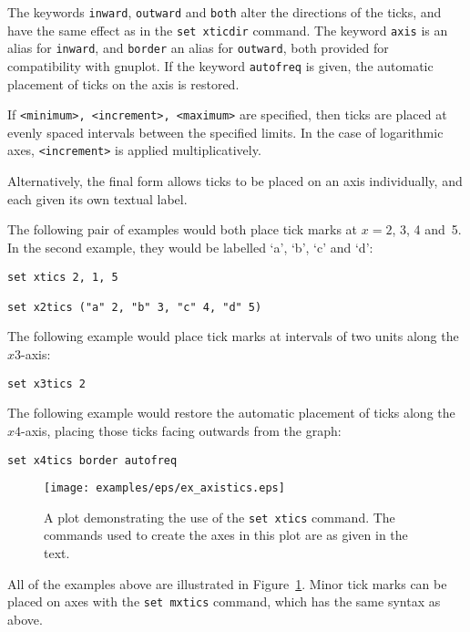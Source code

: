 The keywords {\tt inward}, {\tt outward} and {\tt both} alter the
directions of the ticks, and have the same effect as in the {\tt set
xticdir} command. The keyword {\tt axis} is an alias for {\tt inward},
and {\tt border} an alias for {\tt outward}, both provided for
compatibility with gnuplot. If the keyword {\tt autofreq} is given, the automatic
placement of ticks on the axis is restored.

If {\tt <minimum>, <increment>, <maximum>} are specified, then ticks are
placed at evenly spaced intervals between the specified limits. In the case of
logarithmic axes, {\tt <increment>} is applied multiplicatively.

Alternatively, the final form allows ticks to be placed on an axis
individually, and each given its own textual label.

The following pair of examples would both place tick marks at $x=2$, 3, 4 and~5.
In the second example, they would be labelled `a', `b', `c' and `d':

\begin{verbatim}
set xtics 2, 1, 5

set x2tics ("a" 2, "b" 3, "c" 4, "d" 5)
\end{verbatim}

The following example would place tick marks at intervals of two units along
the $x3$-axis:

\begin{verbatim}
set x3tics 2
\end{verbatim}

The following example would restore the automatic placement of ticks along the
$x4$-axis, placing those ticks facing outwards from the graph:

\begin{verbatim}
set x4tics border autofreq
\end{verbatim}

\begin{figure}
\begin{center}
\texttt{[image: examples/eps/ex\_axistics.eps]}
\end{center}
\caption{A plot demonstrating the use of the {\tt set xtics} command. The commands used to create the axes in this plot are as given in the text.}
\label{fig:ex_axistics}
\end{figure}


All of the examples above are illustrated in Figure~\ref{fig:ex_axistics}.
Minor tick marks can be placed on axes with the {\tt set mxtics} command,
which has the same syntax as above.

